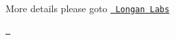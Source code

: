 More details please goto \href{https://longan-labs.cc/serial-can-bus/}{\texttt{ Longan Labs}}

\href{https://github.com/igrigorik/ga-beacon}{\texttt{ }} 